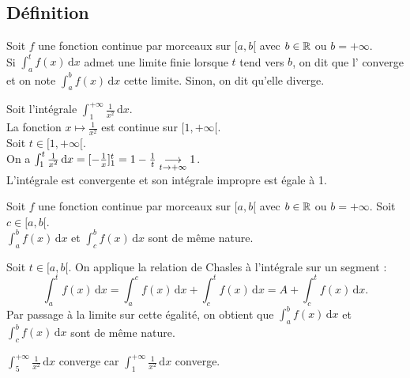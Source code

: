 \documentclass{book}
\begin{document}
\subsection{Définition}
\begin{Definition}[Intégrale impropre sur $[a,b[$]
Soit $f$ une fonction continue par morceaux sur $[a,b [$ avec $b \in \mathbb{R}$ ou $b = +\infty$.\\
Si $\int_a^t f(x) \,\mathrm dx$ admet une limite finie lorsque $t$ tend vers $b$, on dit que l' converge et on
note $\int_a^b f(x) \,\mathrm dx$ cette limite. Sinon, on dit qu'elle diverge.
\end{Definition}
\begin{Exemple}
Soit l'intégrale $\int_1^{+\infty } \frac{1}{x^2}\,\mathrm dx$.\\
La fonction $ x\mapsto  \frac{1}{x^2}$ est continue sur $[1,{+\infty }[$.\\ 
Soit $t\in [1,{+\infty }[$.\\
On a  $\int_1^t \frac{1}{x^2}\,\mathrm dx=[-\frac 1 x]_1^t=1-\frac{1}{t}\tend[t\to+\infty ]1$.\\
L'intégrale est convergente et son intégrale impropre est égale à 1.
\end{Exemple}
\begin{Proposition}
Soit $f$ une fonction continue par morceaux sur $[a,b [$ avec $b \in \mathbb{R}$ ou $b = +\infty$. Soit $c\in[a,b[$.\\
$\int_a^b f(x) \,\mathrm dx$ et $\int_c^b f(x) \,\mathrm dx$ sont de même nature.
\end{Proposition}
\begin{Demonstration}
Soit $t\in[a,b[$. On applique la relation de Chasles à l'intégrale sur un segment :
$$ \int_a^t f(x) \,\mathrm dx = \int_a^c f(x) \,\mathrm dx+\int_c^t f(x) \,\mathrm dx=A+\int_c^t f(x) \,\mathrm dx.$$
Par passage à la limite sur cette égalité, on obtient que $\int_a^b f(x) \,\mathrm dx$ et $\int_c^b f(x) \,\mathrm dx$ sont de même nature.
\end{Demonstration}
\begin{Exemple}
$\int_5^{+\infty } \frac{1}{x^2}\,\mathrm dx$ converge car $\int_1^{+\infty } \frac{1}{x^2}\,\mathrm dx$ converge.
\end{Exemple}
\end{document}
